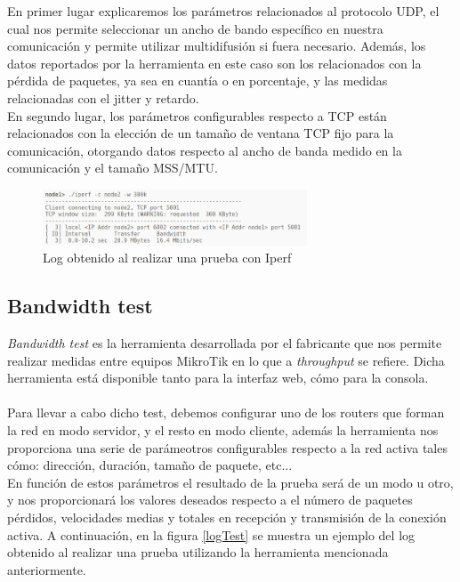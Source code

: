 En primer lugar explicaremos los parámetros relacionados al protocolo UDP, el cual nos permite seleccionar un ancho de bando específico en nuestra comunicación y permite utilizar multidifusión si fuera necesario. Además, los datos reportados por la herramienta en este caso son los relacionados con la pérdida de paquetes, ya sea en cuantía o en porcentaje, y las medidas relacionadas con el jitter y retardo.\\
En segundo lugar, los parámetros configurables respecto a TCP están relacionados con la elección de un tamaño de ventana TCP fijo para la comunicación, otorgando datos respecto al ancho de banda medido en la comunicación y el tamaño MSS/MTU.

\begin{figure}[H]
	\centering
	\includegraphics[width=0.7\textwidth]{img/log_iperf.png}
	\caption{Log obtenido al realizar una prueba con Iperf}
	\label{logTestIperf}
\end{figure}

\subsection{Bandwidth test}
\textit{Bandwidth test} es la herramienta desarrollada por el fabricante que nos permite realizar medidas entre equipos MikroTik en lo que a \textit{throughput} se refiere. Dicha herramienta está disponible tanto para la interfaz web, cómo para la consola.\\\\

Para llevar a cabo dicho test, debemos configurar uno de los routers que forman la red en modo servidor, y el resto en modo cliente, además la herramienta nos proporciona una serie de parámeotros configurables respecto a la red activa tales cómo: dirección, duración, tamaño de paquete, etc... \\
En función de estos parámetros el resultado de la prueba será de un modo u otro, y nos proporcionará los valores deseados respecto a el número de paquetes pérdidos, velocidades medias y totales en recepción y transmisión de la conexión activa. A continuación, en la figura \ref{logTest} se muestra un ejemplo del log obtenido al realizar una prueba utilizando la herramienta mencionada anteriormente.

